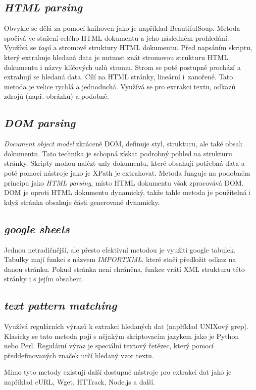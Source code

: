 \subsection{\emph{HTML parsing}}
Obvykle se dělá za pomocí knihoven jako je například BeautifulSoup. Metoda spočívá ve stažení celého HTML dokumentu a jeho následném prohledání. Využívá se \emph{tagů} a stromové struktury HTML dokumentu. Před napsáním skriptu, který extrahuje hledaná data je nutnost znát stromovou strukturu HTML dokumentu i názvy klíčových uzlů stromu. Strom se poté postupně prochází a extrahují se hledaná data. Cílí na HTML stránky, lineární i~zanořené. Tato metoda je velice rychlá a jednoduchá. Využívá se pro extrakci textu, odkazů zdrojů (např. obrázků) a podobně.

\subsection{\emph{DOM parsing}}
\emph{Document object model} zkráceně DOM, definuje styl, strukturu, ale také obsah dokumentu. Tato technika je schopná získat podrobný pohled na strukturu stránky. Skripty mohou nalézt uzly dokumentu, které obsahují potřebná data a poté pomocí nástroje jako je XPath je extrahovat. Metoda funguje na podobném principu jako \emph{HTML parsing}, místo HTML dokumentu však zpracovává DOM. DOM je oproti HTML dokumentu dynamický, takže tahle metoda je použitelná i když stránka obsahuje části generované dynamicky.

\subsection{\emph{google sheets}}
Jednou netradičnější, ale přesto efektivní metodou je využití google tabulek. Tabulky mají funkci s názvem \emph{IMPORTXML}, které stačí předložit odkaz na danou stránku. Pokud stránka není chráněna, funkce vrátí XML strukturu této stránky i s jejím obsahem.

\subsection{\emph{text pattern matching}}
Využívá regulárních výrazů k extrakci hledaných dat (například UNIXový grep). Klasicky se tato metoda pojí s nějakým skriptovacím jazykem jako je Python nebo Perl. Regulární výraz je speciální textový řetězec, který pomocí předdefinovaných značek určí hledaný vzor textu.


Mimo tyto metody existují další dostupné nástroje pro extrakci dat jako je například cURL, Wget, HTTrack, Node.js a další.


